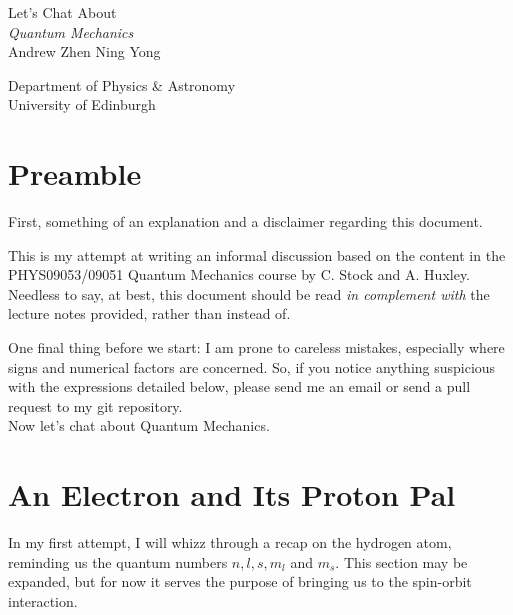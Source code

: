 \documentclass{article}
\numberwithin{equation}{section} %
\begin{document}
\begin{titlepage}
\begin{center}
\vspace*{1.5cm}

{\large Let's Chat About \\ \vspace{0.25cm}\LARGE \textit{Quantum Mechanics}}\\
\vspace{3cm}
Andrew Zhen Ning Yong\\
\vspace{0.25cm}

Department of Physics \& Astronomy\\
University of Edinburgh

\vspace{7cm}


\end{center}
\end{titlepage}

\tableofcontents

\newpage

\section{Preamble}
First, something of an explanation and a disclaimer regarding this document.

This is my attempt at writing an informal discussion based on the content in the PHYS09053/09051 Quantum Mechanics course by C. Stock and A. Huxley. Needless to say, at best, this document should be read \textit{in complement with} the lecture notes provided, rather than instead of. 

One final thing before we start: I am prone to careless mistakes, especially where signs and numerical factors are concerned. So, if you notice anything suspicious with the expressions detailed below, please send me an email or send a pull request to my git repository.\\

\noindent Now let's chat about Quantum Mechanics.

\section{An Electron and Its Proton Pal}

In my first attempt, I will whizz through a recap on the hydrogen atom, reminding us the quantum numbers $n,l,s,m_l$ and $m_s$. This section may be expanded, but for now it serves the purpose of bringing us to the spin-orbit interaction.
\end{document}
